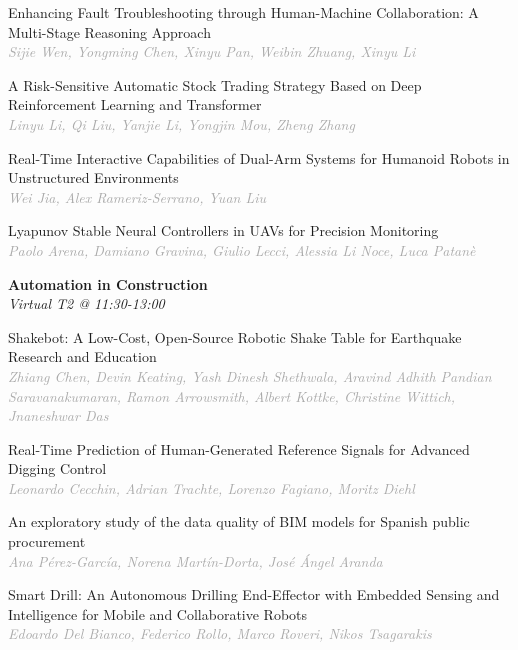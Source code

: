 \begin{multicols*}{2}
\small Enhancing Fault Troubleshooting through Human-Machine Collaboration: A Multi-Stage Reasoning Approach\\ 
\footnotesize \textcolor{darkgray}{\textit{Sijie Wen, Yongming  Chen, Xinyu  Pan, Weibin  Zhuang, Xinyu  Li}}

\small A Risk-Sensitive Automatic Stock Trading Strategy Based on Deep Reinforcement Learning and Transformer\\ 
\footnotesize \textcolor{darkgray}{\textit{Linyu Li, Qi  Liu, Yanjie  Li, Yongjin  Mou, Zheng  Zhang}}

\small Real-Time Interactive Capabilities of Dual-Arm Systems for Humanoid Robots in Unstructured Environments\\ 
\footnotesize \textcolor{darkgray}{\textit{Wei Jia, Alex  Rameriz-Serrano, Yuan  Liu}}

\small Lyapunov Stable Neural Controllers in UAVs for Precision Monitoring\\ 
\footnotesize \textcolor{darkgray}{\textit{Paolo Arena, Damiano  Gravina, Giulio  Lecci, Alessia  Li Noce, Luca  Patanè}}

\normalsize \textbf{Automation in Construction}\\
\small \textit{Virtual T2 @ 11:30-13:00}

\small Shakebot: A Low-Cost, Open-Source Robotic Shake Table for Earthquake Research and Education\\ 
\footnotesize \textcolor{darkgray}{\textit{Zhiang Chen, Devin  Keating, Yash Dinesh  Shethwala, Aravind Adhith  Pandian Saravanakumaran, Ramon  Arrowsmith, Albert  Kottke, Christine  Wittich, Jnaneshwar  Das}}

\small Real-Time Prediction of Human-Generated Reference Signals for Advanced Digging Control\\ 
\footnotesize \textcolor{darkgray}{\textit{Leonardo Cecchin, Adrian  Trachte, Lorenzo  Fagiano, Moritz  Diehl}}

\small An exploratory study of the data quality of BIM models for Spanish public procurement\\ 
\footnotesize \textcolor{darkgray}{\textit{Ana Pérez-García, Norena  Martín-Dorta, José Ángel  Aranda}}

\small Smart Drill: An Autonomous Drilling End-Effector with Embedded Sensing and Intelligence for Mobile and Collaborative Robots\\ 
\footnotesize \textcolor{darkgray}{\textit{Edoardo Del Bianco, Federico  Rollo, Marco  Roveri, Nikos  Tsagarakis}}


\end{multicols*}
